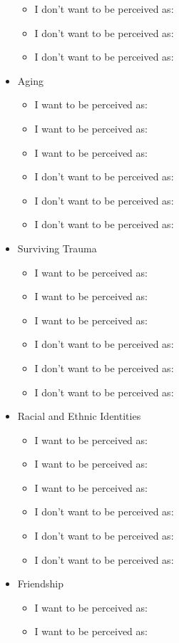 \documentclass[12pt,letterpaper]{article}
\begin{document}
\begin{itemize}
\begin{itemize}
        \item I don't want to be perceived as:
        \item I don't want to be perceived as:
        \item I don't want to be perceived as:
    \end{itemize}
    \item Aging
    \begin{itemize}
        \item I want to be perceived as:
        \item I want to be perceived as:
        \item I want to be perceived as:
        \item I don't want to be perceived as:
        \item I don't want to be perceived as:
        \item I don't want to be perceived as:
    \end{itemize}
    \item Surviving Trauma
    \begin{itemize}
        \item I want to be perceived as:
        \item I want to be perceived as:
        \item I want to be perceived as:
        \item I don't want to be perceived as:
        \item I don't want to be perceived as:
        \item I don't want to be perceived as:
    \end{itemize}
    \item Racial and Ethnic Identities
    \begin{itemize}
        \item I want to be perceived as:
        \item I want to be perceived as:
        \item I want to be perceived as:
        \item I don't want to be perceived as:
        \item I don't want to be perceived as:
        \item I don't want to be perceived as:
    \end{itemize}
    \item Friendship
    \begin{itemize}
        \item I want to be perceived as:
        \item I want to be perceived as:

\end{itemize}
\end{itemize}
\end{document}
